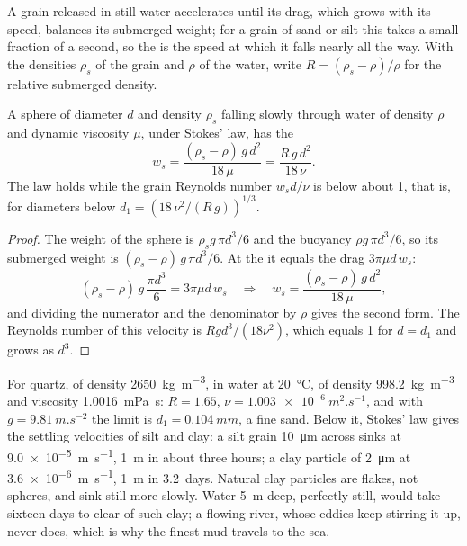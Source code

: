 A grain released in still water accelerates until its drag, which grows with
its speed, balances its submerged weight; for a grain of sand or silt this
takes a small fraction of a second, so the  is the speed at
which it falls nearly all the way. With the densities $\rho_s$ of the grain
and $\rho$ of the water, write $R = (\rho_s - \rho)/\rho$ for the relative
submerged density.

\begin{proposition}\label{prop:b1:erosion-transport:stokes}
A sphere of diameter $d$ and density $\rho_s$ falling slowly through water of
density $\rho$ and dynamic viscosity $\mu$, under Stokes' law, has the 
\[
  w_s = \frac{(\rho_s - \rho)\,g\,d^2}{18\,\mu} = \frac{R\,g\,d^2}{18\,\nu}.
\]
The law holds while the grain Reynolds number $w_s d/\nu$ is below about 1,
that is, for diameters below $d_1 = \left(18\,\nu^2/(R\,g)\right)^{1/3}$.
\end{proposition}

\begin{proof}
The weight of the sphere is $\rho_s g\,\pi d^3/6$ and the buoyancy
$\rho g\,\pi d^3/6$, so its submerged weight is $(\rho_s - \rho)\,g\,\pi d^3/6$.
At the  it equals the drag $3\pi\mu d\,w_s$:
\[
  (\rho_s - \rho)\,g\,\frac{\pi d^3}{6} = 3\pi\mu d\,w_s
  \quad\Longrightarrow\quad
  w_s = \frac{(\rho_s - \rho)\,g\,d^2}{18\,\mu},
\]
and dividing the numerator and the denominator by $\rho$ gives the second form.
The Reynolds number of this velocity is $R g d^3/(18\nu^2)$, which equals 1 for
$d = d_1$ and grows as $d^3$.
\end{proof}

For quartz, of density \qty{2650}{kg.m^{-3}}, in water at \qty{20}{\celsius},
of density \qty{998.2}{kg.m^{-3}} and viscosity \qty{1.0016}{mPa.s}: $R =
1.65$, $\nu = \qty{1.003e-6}{m^2.s^{-1}}$, and with $g =
\qty{9.81}{m.s^{-2}}$ the limit is $d_1 = \qty{0.104}{mm}$, a fine sand. Below
it, Stokes' law gives the settling velocities of silt and clay: a silt grain
\qty{10}{\micro m} across sinks at \qty{9.0e-5}{m.s^{-1}}, \qty{1}{m} in about
three hours; a clay particle of \qty{2}{\micro m} at
\qty{3.6e-6}{m.s^{-1}}, \qty{1}{m} in \num{3.2}~days. Natural clay particles are
flakes, not spheres, and sink still more slowly. Water \qty{5}{m} deep, perfectly
still, would take sixteen days to clear of such clay; a flowing river, whose
eddies keep stirring it up, never does, which is why the finest mud travels
to the sea.

